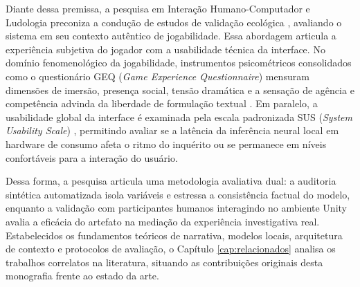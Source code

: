 Diante dessa premissa, a pesquisa em Interação Humano-Computador e Ludologia preconiza a condução de estudos de validação ecológica \cite{ijsselsteijn2013game}, avaliando o sistema em seu contexto autêntico de jogabilidade. Essa abordagem articula a experiência subjetiva do jogador com a usabilidade técnica da interface. No domínio fenomenológico da jogabilidade, instrumentos psicométricos consolidados como o questionário GEQ (\textit{Game Experience Questionnaire}) \cite{ijsselsteijn2013game} mensuram dimensões de imersão, presença social, tensão dramática e a sensação de agência e competência advinda da liberdade de formulação textual \cite{ryan2006motivational}. Em paralelo, a usabilidade global da interface é examinada pela escala padronizada SUS (\textit{System Usability Scale}) \cite{brooke1996sus}, permitindo avaliar se a latência da inferência neural local em hardware de consumo afeta o ritmo do inquérito ou se permanece em níveis confortáveis para a interação do usuário.

Dessa forma, a pesquisa articula uma metodologia avaliativa dual: a auditoria sintética automatizada isola variáveis e estressa a consistência factual do modelo, enquanto a validação com participantes humanos interagindo no ambiente Unity avalia a eficácia do artefato na mediação da experiência investigativa real. Estabelecidos os fundamentos teóricos de narrativa, modelos locais, arquitetura de contexto e protocolos de avaliação, o Capítulo \ref{cap:relacionados} analisa os trabalhos correlatos na literatura, situando as contribuições originais desta monografia frente ao estado da arte.
